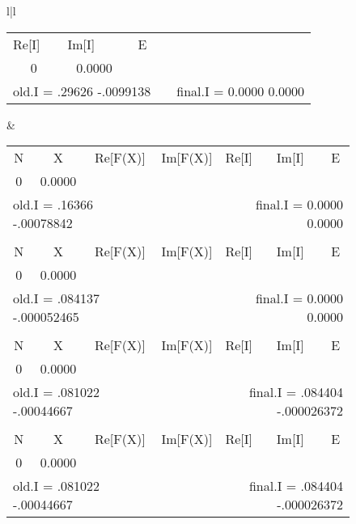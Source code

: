 \begin{figure}
\begin{tabular}{l|l}
\begin{tabular}{cccllll}
            \multicolumn{1}{l}{Re[I]}    & \multicolumn{1}{l}{Im[I]} &
            \multicolumn{1}{c}{E} \\
            0 & 0.0000 & & & & & \\
            \multicolumn{3}{l}{old.I = .29626 -.0099138} & &
            \multicolumn{3}{r}{final.I = 0.0000 0.0000} \\
        \end{tabular}
      &
        \begin{tabular}{cccllll}
            \multicolumn{1}{c}{N}        & \multicolumn{1}{c}{X} &           \multicolumn{1}{c}{Re[F(X)]} & \multicolumn{1}{l}{Im[F(X)]} & 
            \multicolumn{1}{l}{Re[I]}    & \multicolumn{1}{l}{Im[I]} &
            \multicolumn{1}{c}{E} \\
            0 & 0.0000 & & & & & \\ 
            \multicolumn{3}{l}{old.I = .16366 -.00078842} & &
            \multicolumn{3}{r}{final.I = 0.0000 0.0000} \\
        \\
            \multicolumn{1}{c}{N}        & \multicolumn{1}{c}{X} &           \multicolumn{1}{c}{Re[F(X)]} & \multicolumn{1}{l}{Im[F(X)]} & 
            \multicolumn{1}{l}{Re[I]}    & \multicolumn{1}{l}{Im[I]} &
            \multicolumn{1}{c}{E} \\
            0 & 0.0000 & & & & & \\ 
            \multicolumn{3}{l}{old.I = .084137 -.000052465} & &
            \multicolumn{3}{r}{final.I = 0.0000 0.0000}     \\
        \\
            \multicolumn{1}{c}{N}        & \multicolumn{1}{c}{X} &           \multicolumn{1}{c}{Re[F(X)]} & \multicolumn{1}{l}{Im[F(X)]} & 
            \multicolumn{1}{l}{Re[I]}    & \multicolumn{1}{l}{Im[I]} &
            \multicolumn{1}{c}{E} \\
            0 & 0.0000 & & & & & \\
            \multicolumn{3}{l}{old.I = .081022 -.00044667} & &
            \multicolumn{3}{r}{final.I = .084404 -.000026372} \\
        \\
            \multicolumn{1}{c}{N}        & \multicolumn{1}{c}{X} &           \multicolumn{1}{c}{Re[F(X)]} & \multicolumn{1}{l}{Im[F(X)]} & 
            \multicolumn{1}{l}{Re[I]}    & \multicolumn{1}{l}{Im[I]} &
            \multicolumn{1}{c}{E} \\
            0 & 0.0000 & & & & & \\
            \multicolumn{3}{l}{old.I = .081022 -.00044667} & &
            \multicolumn{3}{r}{final.I = .084404 -.000026372} \\
        \end{tabular}
    \end{tabular}
\end{figure}

